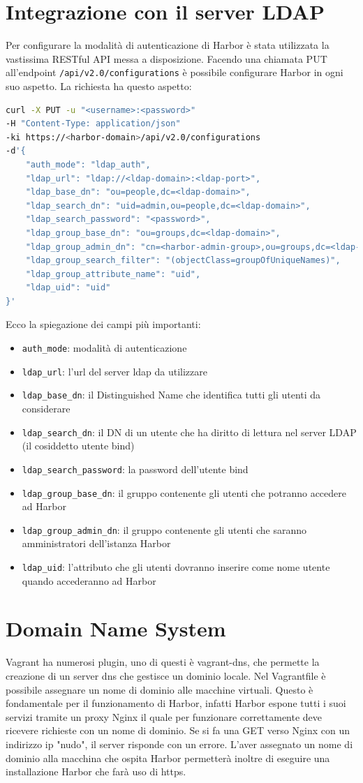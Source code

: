 \documentclass[12pt]{report}
\begin{document}
\section{Integrazione con il server LDAP}
Per configurare la modalità di autenticazione di Harbor è stata utilizzata la vastissima RESTful API messa a disposizione. 
Facendo una chiamata PUT all'endpoint \texttt{/api/v2.0/configurations} è possibile configurare Harbor in ogni suo aspetto. La richiesta ha questo aspetto:
\begin{lstlisting}[language=bash]
curl -X PUT -u "<username>:<password>" 
-H "Content-Type: application/json" 
-ki https://<harbor-domain>/api/v2.0/configurations 
-d'{
    "auth_mode": "ldap_auth",
    "ldap_url": "ldap://<ldap-domain>:<ldap-port>",
    "ldap_base_dn": "ou=people,dc=<ldap-domain>",
    "ldap_search_dn": "uid=admin,ou=people,dc=<ldap-domain>",
    "ldap_search_password": "<password>",
    "ldap_group_base_dn": "ou=groups,dc=<ldap-domain>",
    "ldap_group_admin_dn": "cn=<harbor-admin-group>,ou=groups,dc=<ldap-domain>",
    "ldap_group_search_filter": "(objectClass=groupOfUniqueNames)",
    "ldap_group_attribute_name": "uid",
    "ldap_uid": "uid"
}'
\end{lstlisting}
Ecco la spiegazione dei campi più importanti:
\begin{itemize}
    \item \texttt{auth\_mode}: modalità di autenticazione
    \item \texttt{ldap\_url}: l'url del server ldap da utilizzare
    \item \texttt{ldap\_base\_dn}: il Distinguished Name che identifica tutti gli utenti da considerare
    \item \texttt{ldap\_search\_dn}: il DN di un utente che ha diritto di lettura nel server LDAP (il cosiddetto utente bind)
    \item \texttt{ldap\_search\_password}: la password dell'utente bind
    \item \texttt{ldap\_group\_base\_dn}: il gruppo contenente gli utenti che potranno accedere ad Harbor
    \item \texttt{ldap\_group\_admin\_dn}: il gruppo contenente gli utenti che saranno amministratori dell'istanza Harbor
    \item \texttt{ldap\_uid}: l'attributo che gli utenti dovranno inserire come nome utente quando accederanno ad Harbor
\end{itemize}
\section{Domain Name System}
Vagrant ha numerosi plugin, uno di questi è vagrant-dns, che permette la creazione di un server dns che gestisce un dominio locale. Nel Vagrantfile è possibile assegnare un nome di dominio alle macchine virtuali. Questo è fondamentale per il funzionamento di Harbor, infatti Harbor espone tutti i suoi servizi tramite un proxy Nginx il quale per funzionare correttamente deve ricevere richieste con un nome di dominio. Se si fa una GET verso Nginx con un indirizzo ip "nudo", il server risponde con un errore.
L'aver assegnato un nome di dominio alla macchina che ospita Harbor permetterà inoltre di eseguire una installazione Harbor che farà uso di https.
\end{document}
